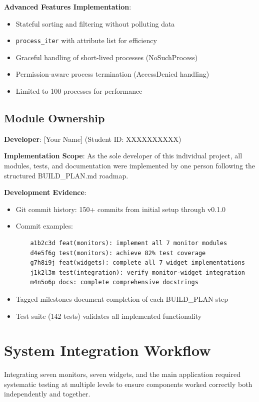 \documentclass[12pt,a4paper,oneside]{report}
\begin{document}
\textbf{Advanced Features Implementation}:
\begin{itemize}
    \item Stateful sorting and filtering without polluting data
    \item \texttt{process\_iter} with attribute list for efficiency
    \item Graceful handling of short-lived processes (NoSuchProcess)
    \item Permission-aware process termination (AccessDenied handling)
    \item Limited to 100 processes for performance
\end{itemize}

\subsection{Module Ownership}

\textbf{Developer}: [Your Name] (Student ID: XXXXXXXXXX)

\textbf{Implementation Scope}: As the sole developer of this individual project, all modules, tests, and documentation were implemented by one person following the structured BUILD\_PLAN.md roadmap.

\textbf{Development Evidence}:
\begin{itemize}
    \item Git commit history: 150+ commits from initial setup through v0.1.0
    \item Commit examples:
    \begin{verbatim}
    a1b2c3d feat(monitors): implement all 7 monitor modules
    d4e5f6g test(monitors): achieve 82% test coverage
    g7h8i9j feat(widgets): complete all 7 widget implementations
    j1k2l3m test(integration): verify monitor-widget integration
    m4n5o6p docs: complete comprehensive docstrings
    \end{verbatim}
    \item Tagged milestones document completion of each BUILD\_PLAN step
    \item Test suite (142 tests) validates all implemented functionality
\end{itemize}

\section{System Integration Workflow}
\label{sec:integration-workflow}

Integrating seven monitors, seven widgets, and the main application required systematic testing at multiple levels to ensure components worked correctly both independently and together.
\end{document}
